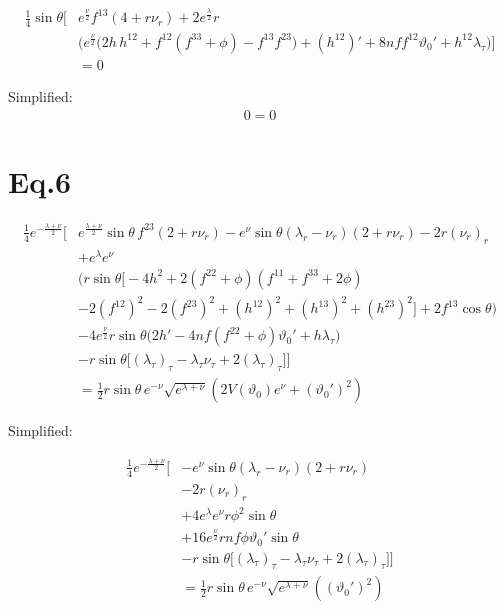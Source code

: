 \documentclass[12pt]{article}
\begin{document}
\begin{align*}
\frac{1}{4} \sin\theta \Big[
 & e^{\frac{\nu}{2}} f^{13} \left( 4 + r \nu_r \right)
 + 2 e^{\frac{\lambda}{2}} r \\ &\Big(
     e^{\frac{\nu}{2}} \big(
       2h\,h^{12}
       + f^{12}(f^{33} + \phi)
       - f^{13} f^{23}
     \big)
     + (h^{12})'
     + 8nf f^{12} \vartheta_0'
     + h^{12} \lambda_\tau
   \Big)
\Big] \\ &= 0
\end{align*}

Simplified:
\begin{align*}
0 = 0
\end{align*}

\section*{Eq.6}

\begin{align*}
\frac{1}{4} e^{-\frac{\lambda + \nu}{2}} \Big[
 & e^{\frac{\lambda + \nu}{2}} \sin\theta\, f^{23}\left(2 + r\nu_r\right)
 - e^{\nu} \sin\theta
   \left( \lambda_r - \nu_r \right) \left(2 + r\nu_r\right)
 - 2r (\nu_r)_r\\
 & + e^{\lambda} e^{\nu} \\
   &\Big(
     r \sin\theta
       \big[
         -4h^2
         + 2(f^{22} + \phi)(f^{11} + f^{33} + 2\phi) \\
         &- 2(f^{12})^2 - 2(f^{23})^2
         + (h^{12})^2 + (h^{13})^2 + (h^{23})^2
       \big]
     + 2f^{13}\cos\theta
   \Big) \\
 & - 4 e^{\frac{\nu}{2}} r \sin\theta
   \Big(
     2h'
     - 4nf (f^{22} + \phi)\vartheta_0'
     + h\lambda_\tau
   \Big) \\
 &- r \sin\theta
   \Big[
     (\lambda_\tau)_\tau
     - \lambda_\tau \nu_\tau
     + 2(\lambda_\tau)_\tau
   \Big]
\Big]
\nonumber \\
&= \frac{1}{2} r \sin\theta\, e^{-\nu} \sqrt{e^{\lambda + \nu}}
   \left(2V(\vartheta_0)e^{\nu} + (\vartheta_0')^2\right)
\end{align*}

Simplified:

\begin{align*}
\frac{1}{4} e^{-\frac{\lambda + \nu}{2}} \Big[
 &- e^{\nu} \sin\theta
   \left( \lambda_r - \nu_r \right) \left(2 + r\nu_r\right) \\
 & - 2r (\nu_r)_r\\
 & + 4 e^{\lambda} e^{\nu} r\phi^2 \sin\theta \\
 & + 16 e^{\frac{\nu}{2}} r nf\phi\vartheta_0' \sin\theta\\
 & - r \sin\theta
   \Big[
     (\lambda_\tau)_\tau
     - \lambda_\tau \nu_\tau
     + 2(\lambda_\tau)_\tau
   \Big]
\Big] \\
&= \frac{1}{2} r \sin\theta\, e^{-\nu} \sqrt{e^{\lambda + \nu}}
   \left((\vartheta_0')^2\right)
\end{align*}
\end{document}
